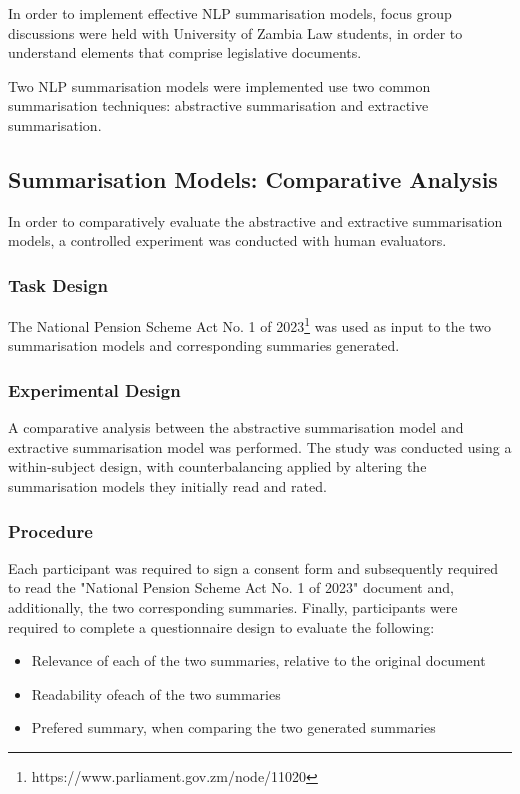 \documentclass[conference]{IEEEtran}
\begin{document}
In order to implement effective NLP summarisation models, focus group discussions were held with University of Zambia Law students, in order to understand elements that comprise legislative documents.

Two NLP summarisation models were implemented use two common summarisation techniques: abstractive summarisation and extractive summarisation.

\subsection{Summarisation Models: Comparative Analysis}
\label{sec:methodology:summarisation_models_analysis}
In order to comparatively evaluate the abstractive and extractive summarisation models, a controlled experiment was conducted with human evaluators.

\subsubsection{Task Design}
\label{sec:methodology:summarisation_models_analysis:task_design}
The National Pension Scheme Act No. 1 of 2023\footnote{https://www.parliament.gov.zm/node/11020} was used as input to the two summarisation models and corresponding summaries generated.

\subsubsection{Experimental Design}
\label{sec:methodology:summarisation_models_analysis:experimental_design}
A comparative analysis between the abstractive summarisation model and extractive summarisation model was performed. The study was conducted using a within-subject design, with counterbalancing applied by altering the summarisation models they initially read and rated.

\subsubsection{Procedure}
\label{sec:methodology:summarisation_models_analysis:procedure}
Each participant was required to sign a consent form and subsequently required to read the "National Pension Scheme Act No. 1 of 2023" document and, additionally, the two corresponding summaries. Finally, participants were required to complete a questionnaire design to evaluate the following:
\begin{itemize}
    \item Relevance of each of the two summaries, relative to the original document
    \item Readability ofeach of the two summaries
    \item Prefered summary, when comparing the two generated summaries
\end{itemize}
\end{document}
